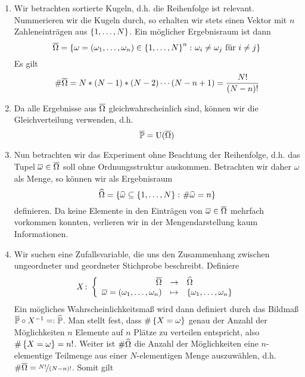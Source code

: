 \begin{exercisePage}
	\begin{enumerate}[leftmargin=*, label=(\alph*)]
		\item Wir betrachten sortierte Kugeln, d.h. die Reihenfolge ist relevant. Nummerieren wir die Kugeln durch, so erhalten wir stets einen Vektor mit $n$ Zahleneinträgen aus $\left\{ 1, \dots , N \right\}$. Ein möglicher Ergebnisraum ist dann
		\begin{equation*}
			\overline{\Omega} = \left\{ \omega = (\omega_1 , \dots , \omega_n) \in \left\{ 1, \dots , N \right\}^n \colon \omega_i \neq \omega_j \text{ für } i \neq j \right\}
		\end{equation*}
		Es gilt
		\begin{equation*}
			\# \overline{\Omega} = N * (N-1) * (N-2) \cdots (N-n+1) = \frac{N!}{(N-n)!}
		\end{equation*}
		\item Da alle Ergebnisse aus $\overline{\Omega}$ gleichwahrscheinlich sind, können wir die Gleichverteilung verwenden, d.h.
		\begin{equation*}
			\overline{\mathbb{P}} = \operatorname{U}(\overline{\Omega})
		\end{equation*}
		\item Nun betrachten wir das Experiment ohne Beachtung der Reihenfolge, d.h. das Tupel $\overline{\omega} \in \overline{\Omega}$ soll ohne Ordnungsstruktur auskommen. Betrachten wir daher $\omega$ als Menge, so können wir als Ergebnisraum 
		\begin{equation*}
			\widehat{\Omega} = \left\{ \widehat{\omega} \subseteq \left\{ 1 , \dots , N \right\} \colon \# \widehat{\omega} = n \right\}
		\end{equation*}
		definieren. Da keine Elemente in den Einträgen von $\overline{\omega} \in \overline{\Omega}$ mehrfach vorkommen konnten, verlieren wir in der Mengendarstellung kaum Informationen.
		\item Wir suchen eine Zufallsvariable, die uns den Zusammenhang zwischen ungeordneter und geordneter Stichprobe beschreibt. Definiere
		\begin{equation*}
			\bigabb{X}{\quer\Omega}{\dach\Omega}%
			{\quer\omega = (\omega_1 , \dots , \omega_n)}{\menge{\omega_1 , \dots , \omega_n}}
		\end{equation*}
		Ein mögliches Wahrscheinlichkeitsmaß wird dann definiert durch das Bildmaß $\overline{\mathbb{P}} \circ X^{-1} \mathrel{=:} \widehat{\mathbb{P}}$. Man stellt fest, dass $\# \left\{ X=\omega \right\}$ genau der Anzahl der Möglichkeiten $n$ Elemente auf $n$ Plätze zu verteilen entspricht, also $\# \left\{ X = \omega \right\} = n!$. Weiter ist $\# \widehat{\Omega}$ die Anzahl der Möglichkeiten eine $n$-elementige Teilmenge aus einer $N$-elementigen Menge auszuwählen, d.h. $\# \quer{\Omega} = \lfrac{N!}{(N-n)!}$. Somit gilt

\end{enumerate}
\end{exercisePage}
